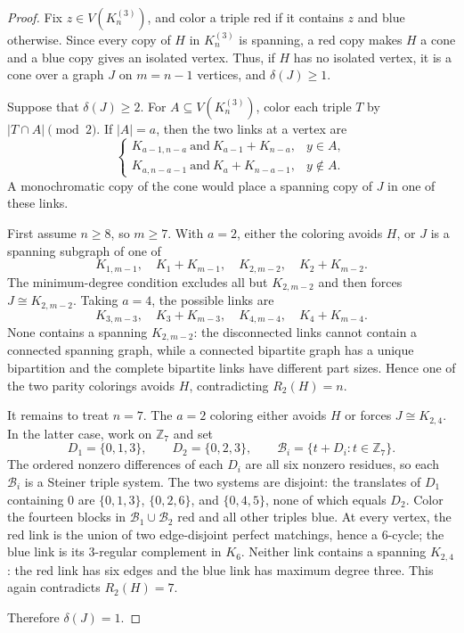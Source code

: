 \documentclass[11pt]{amsart}
\newcommand{\Z}{\mathbb Z}
\begin{document}
\begin{proof}
Fix $z\in V(K_n^{(3)})$, and color a triple red if it contains $z$ and
blue otherwise. Since every copy of $H$ in $K_n^{(3)}$ is spanning, a
red copy makes $H$ a cone and a blue copy gives an isolated vertex. Thus,
if $H$ has no isolated vertex, it is a cone over a graph $J$ on
$m=n-1$ vertices, and $\delta(J)\ge1$.

Suppose that $\delta(J)\ge2$. For $A\subseteq V(K_n^{(3)})$, color each
triple $T$ by $|T\cap A|\pmod 2$. If $|A|=a$, then the two links at a
vertex are
\[
\begin{cases}
K_{a-1,n-a}\ \text{and}\ K_{a-1}+K_{n-a},&y\in A,\\
K_{a,n-a-1}\ \text{and}\ K_a+K_{n-a-1},&y\notin A.
\end{cases}
\]
A monochromatic copy of the cone would place a spanning copy of $J$ in
one of these links.

First assume $n\ge8$, so $m\ge7$. With $a=2$, either the coloring avoids
$H$, or $J$ is a spanning subgraph of one of
\[
  K_{1,m-1},\quad K_1+K_{m-1},\quad
  K_{2,m-2},\quad K_2+K_{m-2}.
\]
The minimum-degree condition excludes all but $K_{2,m-2}$ and then forces
$J\cong K_{2,m-2}$. Taking $a=4$, the possible links are
\[
  K_{3,m-3},\quad K_3+K_{m-3},\quad
  K_{4,m-4},\quad K_4+K_{m-4}.
\]
None contains a spanning $K_{2,m-2}$: the disconnected links cannot
contain a connected spanning graph, while a connected bipartite graph has
a unique bipartition and the complete bipartite links have different part
sizes. Hence one of the two parity colorings avoids $H$, contradicting
$R_2(H)=n$.

It remains to treat $n=7$. The $a=2$ coloring either avoids $H$ or forces
$J\cong K_{2,4}$. In the latter case, work on $\Z_7$ and set
\[
  D_1=\{0,1,3\},\qquad D_2=\{0,2,3\},\qquad
  \mathcal B_i=\{t+D_i:t\in\Z_7\}.
\]
The ordered nonzero differences of each $D_i$ are all six nonzero
residues, so each $\mathcal B_i$ is a Steiner triple system. The two
systems are disjoint: the translates of $D_1$ containing $0$ are
$\{0,1,3\}$, $\{0,2,6\}$, and $\{0,4,5\}$, none of which equals $D_2$.
Color the fourteen blocks in $\mathcal B_1\cup\mathcal B_2$ red and all
other triples blue. At every vertex, the red link is the union of two
edge-disjoint perfect matchings, hence a $6$-cycle; the blue link is its
$3$-regular complement in $K_6$. Neither link contains a spanning
$K_{2,4}$: the red link has six edges and the blue link has maximum degree
three. This again contradicts $R_2(H)=7$.

Therefore $\delta(J)=1$.
\end{proof}
\end{document}

